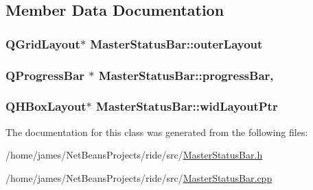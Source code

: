 \subsection{Member Data Documentation}
\hypertarget{class_master_status_bar_a93dc52108a54b21d0283d6c6e4beec87}{
\subsubsection[{outer\-Layout}]{\setlength{\rightskip}{0pt plus 5cm}Q\-Grid\-Layout$\ast$ Master\-Status\-Bar\-::outer\-Layout\hspace{0.3cm}{\ttfamily [private]}}}\label{class_master_status_bar_a93dc52108a54b21d0283d6c6e4beec87}
\hypertarget{class_master_status_bar_a3e6e1fbd09ecda5a40bf8ea7e8ca62b5}{
\subsubsection[{progress\-Bar}]{\setlength{\rightskip}{0pt plus 5cm}Q\-Progress\-Bar $\ast$ Master\-Status\-Bar\-::progress\-Bar\hspace{0.3cm}{\ttfamily [static]}, {\ttfamily [private]}}}\label{class_master_status_bar_a3e6e1fbd09ecda5a40bf8ea7e8ca62b5}
\hypertarget{class_master_status_bar_ac190f5976fd1404a4ed5ba385cc31385}{
\subsubsection[{wid\-Layout\-Ptr}]{\setlength{\rightskip}{0pt plus 5cm}Q\-H\-Box\-Layout$\ast$ Master\-Status\-Bar\-::wid\-Layout\-Ptr\hspace{0.3cm}{\ttfamily [private]}}}\label{class_master_status_bar_ac190f5976fd1404a4ed5ba385cc31385}


The documentation for this class was generated from the following files\-:\begin{DoxyCompactItemize}
\item 
/home/james/\-Net\-Beans\-Projects/ride/src/\hyperlink{_master_status_bar_8h}{Master\-Status\-Bar.\-h}\item 
/home/james/\-Net\-Beans\-Projects/ride/src/\hyperlink{_master_status_bar_8cpp}{Master\-Status\-Bar.\-cpp}\end{DoxyCompactItemize}
